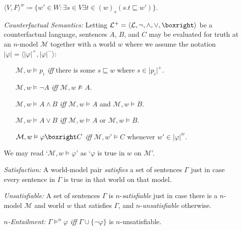 \documentclass[a4paper, 11pt]{article} %
\newcommand{\tuple}[1]{\langle#1\rangle} %
\newcommand{\set}[1]{\lbrace#1\rbrace} %
\newcommand{\M}[0]{\mathcal{M}}
\renewcommand{\L}[0]{\mathcal{L}}
\renewcommand{\vert}[1]{\lvert#1\rvert}
\begin{document}
\begin{enumerate}
      $\tuple{V,F}^w\coloneq \set{w'\in W:\exists s\in V\exists t\in(w)_s(s.t\sqsubseteq w')}$.
  \item[\it Counterfactual Semantics:] Letting $\L^+=\tuple{\L,\neg,\wedge,\vee,\boxright}$ be a counterfactual language, sentences $A$, $B$, and $C$ may be evaluated for truth at an $n$-model $\M$ together with a world $w$ where we assume the notation $\vert{\varphi}=\tuple{\vert{\varphi}^+,\vert{\varphi}^-}$:
    \begin{itemize}
      \item[] $\M, w \vDash p_i$ \textit{iff} there is some $s \sqsubseteq w$ where $s \in \vert{p_i}^+$.
      \item[] $\M, w \vDash \neg A$ \textit{iff} $\M, w \nvDash A$.
      \item[] $\M, w \vDash A \wedge B$ \textit{iff} $\M, w \vDash A$ and $\M, w \vDash B$.
      \item[] $\M, w \vDash A \vee B$ \textit{iff} $\M, w \vDash A$ or $\M, w \vDash B$.
      \item[] $\M, w \vDash \varphi\boxright C$ \textit{iff} $\M, w' \vDash C$ whenever $w'\in\vert{\varphi}^w$.
    \end{itemize}
    We may read `$\M, w \vDash \varphi$' as `$\varphi$ is true in $w$ on $\M$'.
  \item[\it Satisfaction:] A world-model pair \textit{satisfies} a set of sentences $\Gamma$ just in case every sentence in $\Gamma$ is true in that world on that model.
  \item[\it Unsatisfiable:] A set of sentences $\Gamma$ is $n$-\textit{satisfiable} just in case there is a $n$-model $\M$ and world $w$ that satisfies $\Gamma$, and $n$-\textit{unsatisfiable} otherwise.
  \item[\it $n$-Entailment:] $\Gamma \vDash^n \varphi$ \textit{iff} $\Gamma\cup\set{\neg\varphi}$ is $n$-unsatisfiable. 
\end{enumerate}
\end{document}
